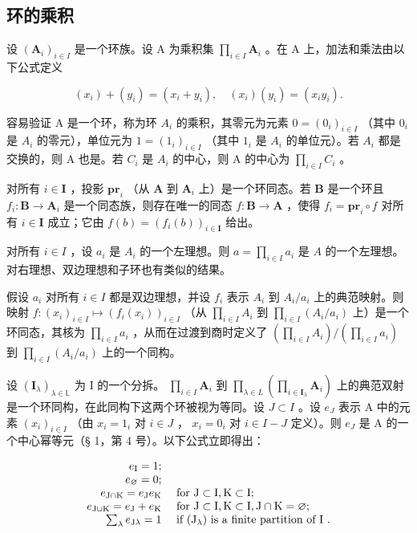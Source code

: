 \subsection{环的乘积}

设 \((\mathbf{A}_i)_{i\in I}\) 是一个环族。设 A 为乘积集 \(\prod_{i\in I} \mathbf{A}_i\) 。在 A 上，加法和乘法由以下公式定义

\[
(x _ {i}) + (y _ {i}) = (x _ {i} + y _ {i}), \quad (x _ {i}) (y _ {i}) = (x _ {i} y _ {i}).\tag{22}
\]

容易验证 A 是一个环，称为环 \(A_{i}\) 的乘积，其零元为元素 \(0 = (0_{i})_{i \in I}\) （其中 \(0_{i}\) 是 \(A_{i}\) 的零元），单位元为 \(1 = (1_{i})_{i \in I}\) （其中 \(1_{i}\) 是 \(A_{i}\) 的单位元）。若 \(A_{i}\) 都是交换的，则 A 也是。若 \(C_{i}\) 是 \(A_{i}\) 的中心，则 A 的中心为 \(\prod_{i \in I} C_{i}\) 。

对所有 \(i \in \mathbf{I}\) ，投影 \(\mathbf{pr}_i\) （从 \(\mathbf{A}\) 到 \(\mathbf{A}_i\) 上）是一个环同态。若 \(\mathbf{B}\) 是一个环且 \(f_i \colon \mathbf{B} \to \mathbf{A}_i\) 是一个同态族，则存在唯一的同态 \(f \colon \mathbf{B} \to \mathbf{A}\) ，使得 \(f_i = \mathbf{pr}_i \circ f\) 对所有 \(i \in \mathbf{I}\) 成立；它由 \(f(b) = (f_i(b))_{i \in \mathbf{I}}\) 给出。

对所有 \(i \in I\) ，设 \(a_i\) 是 \(A_i\) 的一个左理想。则 \(a = \prod_{i \in I} a_i\) 是 \(A\) 的一个左理想。对右理想、双边理想和子环也有类似的结果。

假设 \(a_{i}\) 对所有 \(i \in I\) 都是双边理想，并设 \(f_{i}\) 表示 \(A_{i}\) 到 \(A_{i}/a_{i}\) 上的典范映射。则映射 \(f: (x_{i})_{i \in I} \mapsto (f_{i}(x_{i}))_{i \in I}\) （从 \(\prod_{i \in I} A_{i}\) 到 \(\prod_{i \in I} (A_{i}/a_{i})\) 上）是一个环同态，其核为 \(\prod_{i \in I} a_{i}\) ，从而在过渡到商时定义了 \(\left( \prod_{i \in I} A_{i} \right) / \left( \prod_{i \in I} a_{i} \right)\) 到 \(\prod_{i \in I} (A_{i}/a_{i})\) 上的一个同构。

设 \((\mathbf{I}_{\lambda})_{\lambda \in \mathbb{L}}\) 为 I 的一个分拆。 \(\prod_{i\in I}\mathbf{A}_i\) 到 \(\prod_{\lambda \in L}\left(\prod_{i\in \mathbf{I}_{\lambda}}\mathbf{A}_i\right)\) 上的典范双射是一个环同构，在此同构下这两个环被视为等同。设 \(J\subset I\) 。设 \(e_J\) 表示 A 中的元素 \((x_i)_{i\in I}\) （由 \(x_{i} = 1_{i}\) 对 \(i\in J\) ， \(x_{i} = 0_{i}\) 对 \(i\in I - J\) 定义）。则 \(e_J\) 是 A 的一个中心幂等元（§ 1，第 4 号）。以下公式立即得出：

\[
\begin{array}{r l} e _ {\mathrm{I}} = 1; \\ e _ {\varnothing} = 0; \\ e _ {\mathrm{J} \cap \mathrm{K}} = e _ {\mathrm{J}} e _ {\mathrm{K}} & \text { for   } \mathrm{J} \subset \mathrm{I}, \mathrm{K} \subset \mathrm{I}; \\ e _ {\mathrm{J} \cup \mathrm{K}} = e _ {\mathrm{J}} + e _ {\mathrm{K}} & \text { for   } \mathrm{J} \subset \mathrm{I}, \mathrm{K} \subset \mathrm{I}, \mathrm{J} \cap \mathrm{K} = \varnothing ; \\ \sum_ {\lambda} e _ {\mathrm{J} \lambda} = 1 & \text { if   } (\mathrm{J} _ {\lambda}) \text {   is   a   finite   partition   of   I }. \end{array}
\]

